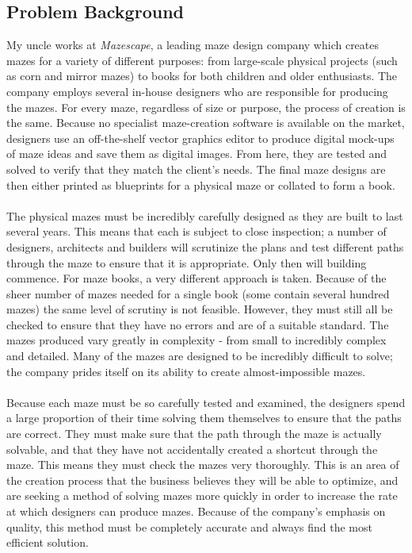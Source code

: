 \documentclass[titlepage]{article}
\begin{document}
\subsection{Problem Background}
My uncle works at \textit{Mazescape}, a leading maze design company which creates mazes for a variety of different purposes: from large-scale physical projects (such as corn and mirror mazes) to books for both children and older enthusiasts. The company employs several in-house designers who are responsible for producing the mazes. For every maze, regardless of size or purpose, the process of creation is the same. Because no specialist maze-creation software is available on the market, designers use an off-the-shelf vector graphics editor to produce digital mock-ups of maze ideas and save them as digital images. From here, they are tested and solved to verify that they match the client's needs. The final maze designs are then either printed as blueprints for a physical maze or collated to form a book. 
\\\\
The physical mazes must be incredibly carefully designed as they are built to last several years. This means that each is subject to close inspection; a number of designers, architects and builders will scrutinize the plans and test different paths through the maze to ensure that it is appropriate. Only then will building commence. For maze books, a very different approach is taken. Because of the sheer number of mazes needed for a single book (some contain several hundred mazes) the same level of scrutiny is not feasible. However, they must still all be checked to ensure that they have no errors and are of a suitable standard. The mazes produced vary greatly in complexity - from small to incredibly complex and detailed. Many of the mazes are designed to be incredibly difficult to solve; the company prides itself on its ability to create almost-impossible mazes. 
\\\\
Because each maze must be so carefully tested and examined, the designers spend a large proportion of their time solving them themselves to ensure that the paths are correct. They must make sure that the path through the maze is actually solvable, and that they have not accidentally created a shortcut through the maze. This means they must check the mazes very thoroughly. This is an area of the creation process that the business believes they will be able to optimize, and are seeking a method of solving mazes more quickly in order to increase the rate at which designers can produce mazes. Because of the company's emphasis on quality, this method must be completely accurate and always find the most efficient solution.
\end{document}
